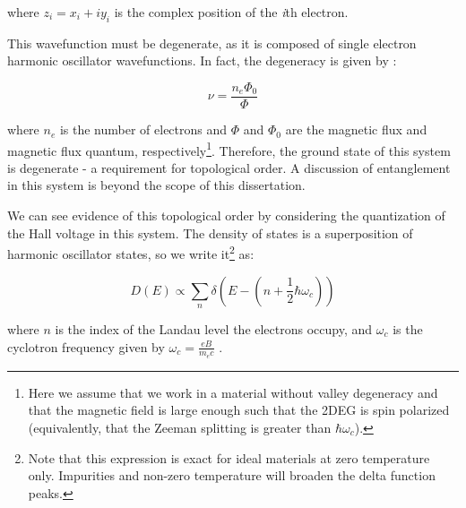 where $z_{i} = x_{i} + iy_{i}$ is the complex position of the \textit{i}th electron.

This wavefunction must be degenerate, as it is composed of single electron harmonic oscillator wavefunctions. In fact, the degeneracy is given by \cite{Chakraborty1995}:

\begin{equation}
\nu = \frac{n_{e}\Phi_{0}}{\Phi}
\end{equation}

where $n_{e}$ is the number of electrons and $\Phi$ and $\Phi_{0}$ are the magnetic flux and magnetic flux quantum, respectively\footnote{Here we assume that we work in a material without valley degeneracy and that the magnetic field is large enough such that the 2DEG is spin polarized (equivalently, that the Zeeman splitting is greater than $\hbar \omega_{c}$).}. Therefore, the ground state of this system is degenerate - a requirement for topological order. A discussion of entanglement in this system is beyond the scope of this dissertation.

We can see evidence of this topological order by considering the quantization of the Hall voltage in this system. The density of states is a superposition of harmonic oscillator states, so we write it\footnote{Note that this expression is exact for ideal materials at zero temperature only. Impurities and non-zero temperature will broaden the delta function peaks.} as:

\begin{equation}
D(E) \propto \sum_{n} \delta \left(E - \left(n + \frac{1}{2} \hbar \omega_{c} \right) \right)
\end{equation}

where $n$ is the index of the Landau level the electrons occupy, and $\omega_{c}$ is the cyclotron frequency given by $\omega_{c} = \frac{eB}{m_{e} c}$ \cite{Chakraborty1995}.

